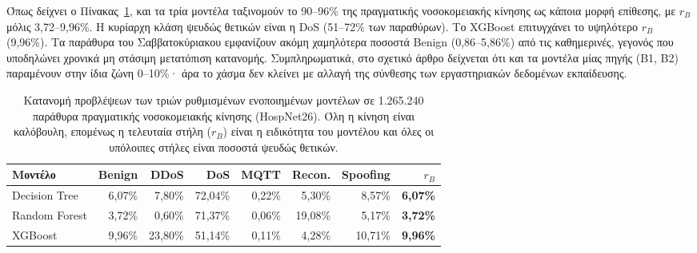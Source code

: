 
Όπως δείχνει ο Πίνακας~\ref{gr:tab:hospnet}, και τα τρία μοντέλα ταξινομούν το 90--96\% της πραγματικής νοσοκομειακής κίνησης ως κάποια μορφή επίθεσης, με $r_B$ μόλις 3,72--9,96\%. Η κυρίαρχη κλάση ψευδώς θετικών είναι η DoS (51--72\% των παραθύρων). Το XGBoost επιτυγχάνει το υψηλότερο $r_B$ (9,96\%). Τα παράθυρα του Σαββατοκύριακου εμφανίζουν ακόμη χαμηλότερα ποσοστά Benign (0,86--5,86\%) από τις καθημερινές, γεγονός που υποδηλώνει χρονικά μη στάσιμη μετατόπιση κατανομής. Συμπληρωματικά, στο σχετικό άρθρο δείχνεται ότι και τα μοντέλα μίας πηγής (B1, B2) παραμένουν στην ίδια ζώνη 0--10\%· άρα το χάσμα δεν κλείνει με αλλαγή της σύνθεσης των εργαστηριακών δεδομένων εκπαίδευσης.

\begin{table}[!htbp]
\centering
\caption[]{Κατανομή προβλέψεων των τριών ρυθμισμένων ενοποιημένων μοντέλων σε 1.265.240 παράθυρα πραγματικής νοσοκομειακής κίνησης (HospNet26). Όλη η κίνηση είναι καλόβουλη, επομένως η τελευταία στήλη ($r_B$) είναι η ειδικότητα του μοντέλου και όλες οι υπόλοιπες στήλες είναι ποσοστά ψευδώς θετικών.}
\label{gr:tab:hospnet}
\small
\begin{tabular}{@{}l r r r r r r | r@{}}
\toprule
\textbf{Μοντέλο} & \textbf{Benign} & \textbf{DDoS} & \textbf{DoS} & \textbf{MQTT} & \textbf{Recon.} & \textbf{Spoofing} & \textbf{$r_B$} \\
\midrule
Decision Tree  & 6,07\% &  7,80\% & 72,04\% & 0,22\% &  5,30\% &  8,57\% & \textbf{6,07\%} \\
Random Forest  & 3,72\% &  0,60\% & 71,37\% & 0,06\% & 19,08\% &  5,17\% & \textbf{3,72\%} \\
XGBoost        & 9,96\% & 23,80\% & 51,14\% & 0,11\% &  4,28\% & 10,71\% & \textbf{9,96\%} \\
\bottomrule
\end{tabular}
\end{table}


